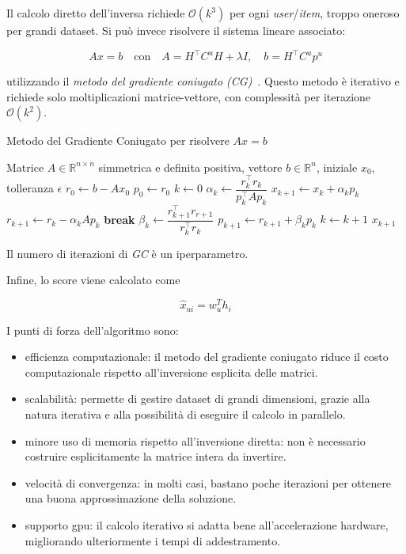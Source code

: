 Il calcolo diretto dell'inversa richiede $\mathcal{O}(k^3)$ per ogni \textit{user}/\textit{item}, troppo oneroso per grandi dataset. Si può invece risolvere il sistema lineare associato:

\[
A x = b \quad \text{con} \quad A = H^\top C^u H + \lambda I, \quad b = H^\top C^u p^u
\]

utilizzando il \textit{metodo del gradiente coniugato (CG)}~\cite{ALS_opt}. Questo metodo è iterativo e richiede solo moltiplicazioni matrice-vettore, con complessità per iterazione $\mathcal{O}(k^2)$.

\begin{algorithm}[H]
    \caption{Metodo del Gradiente Coniugato per risolvere $Ax = b$}
    \begin{algorithmic}[1]
    \Require Matrice $A \in \mathbb{R}^{n \times n}$ simmetrica e definita positiva, vettore $b \in \mathbb{R}^n$, iniziale $x_0$, tolleranza $\epsilon$
    \State $r_0 \gets b - A x_0$
    \State $p_0 \gets r_0$
    \State $k \gets 0$
        \State $\alpha_k \gets \dfrac{r_k^\top r_k}{p_k^\top A p_k}$
        \State $x_{k+1} \gets x_k + \alpha_k p_k$
        \State $r_{k+1} \gets r_k - \alpha_k A p_k$
            \State \textbf{break}
        \EndIf
        \State $\beta_k \gets \dfrac{r_{k+1}^\top r_{r+1}}{r_k^\top r_k}$
        \State $p_{k+1} \gets r_{k+1} + \beta_k p_k$
        \State $k \gets k + 1$
    \EndWhile
    \State \Return $x_{k+1}$
    \end{algorithmic}
\end{algorithm}
    
Il numero di iterazioni di \textit{GC} è un iperparametro.

Infine, lo score viene calcolato come

\[
\hat{x}_{ui} = w_u^T h_i
\]

I punti di forza dell'algoritmo sono:
\begin{itemize}
    \item efficienza computazionale: il metodo del gradiente coniugato riduce il costo computazionale rispetto all'inversione esplicita delle matrici.
    \item scalabilità: permette di gestire dataset di grandi dimensioni, grazie alla natura iterativa e alla possibilità di eseguire il calcolo in parallelo.
    \item minore uso di memoria rispetto all'inversione diretta: non è necessario costruire esplicitamente la matrice intera da invertire.
    \item velocità di convergenza: in molti casi, bastano poche iterazioni per ottenere una buona approssimazione della soluzione.
    \item supporto gpu: il calcolo iterativo si adatta bene all'accelerazione hardware, migliorando ulteriormente i tempi di addestramento.
\end{itemize}

